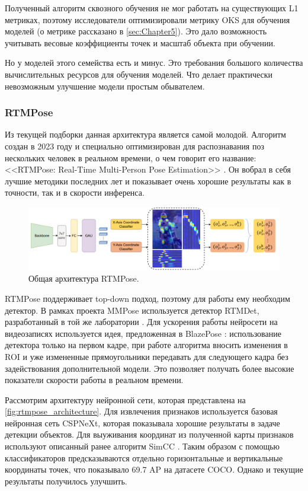 Полученный алгоритм сквозного обучения не мог работать на существующих L1 метриках, поэтому исследователи оптимизировали метрику OKS для обучения моделей (о метрике рассказано в \autoref{sec:Chapter5}). Это дало возможность учитывать весовые коэффициенты точек и масштаб объекта при обучении.

Но у моделей этого семейства есть и минус. Это требования большого количества вычислительных ресурсов для обучения моделей. Что делает практически невозможным улучшение модели простым обывателем.
 

\subsubsection*{RTMPose}

Из текущей подборки данная архитектура является самой молодой. Алгоритм создан в 2023 году и специально оптимизирован для распознавания поз нескольких человек в реальном времени, о чем говорит его название: <<RTMPose: Real-Time Multi-Person Pose Estimation>> \cite{rtmpose}. Он вобрал в себя лучшие методики последних лет и показывает очень хорошие результаты как в точности, так и в скорости инференса.

\begin{figure}[h]
	\centering
	\includegraphics[width=\textwidth]{./images/review/rtmpose}
	\caption{Общая архитектура RTMPose. \cite{rtmpose}}
	\label{fig:rtmpose_architecture}
\end{figure}

RTMPose поддерживает top-down подход, поэтому для работы ему необходим детектор. В рамках проекта MMPose используется детектор RTMDet, разработанный в той же лаборатории \cite{mmpose, rtmdet}. Для ускорения работы нейросети на видеозаписях используется идея, предложенная в BlazePose \cite{BlazePose}: использование детектора только на первом кадре, при работе алгоритма вносить изменения в ROI и уже измененные прямоугольники передавать для следующего кадра без задействования дополнительной модели. Это позволяет получать более высокие показатели скорости работы в реальном времени.

Рассмотрим архитектуру нейронной сети, которая представлена на \autoref{fig:rtmpose_architecture}. Для извлечения признаков используется базовая нейронная сеть CSPNeXt, которая показывала хорошие результаты в задаче детекции объектов. Для выуживания координат из полученной карты признаков используют описанный ранее алгоритм SimCC \cite{simcc}. Таким образом с помощью классификаторов предсказываются отдельно горизонтальные и вертикальные координаты точек, что показывало 69.7 AP на датасете COCO. Однако и текущие результаты получилось улучшить.


